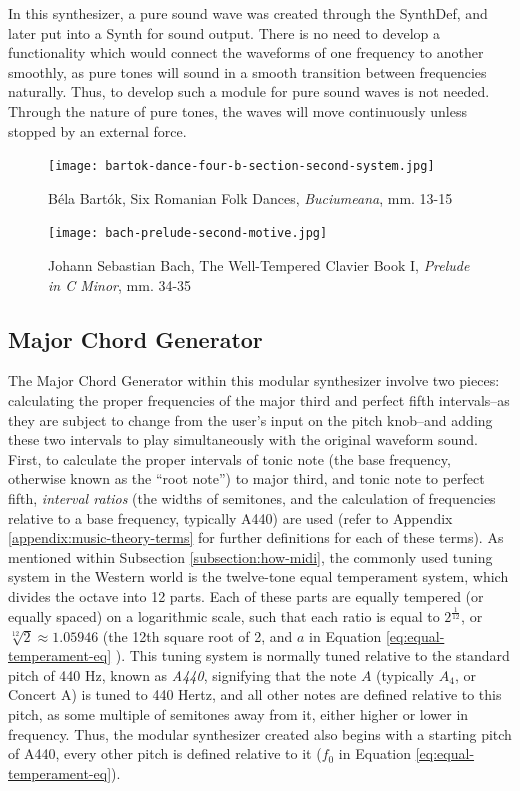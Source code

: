In this synthesizer, a pure sound wave was created through the SynthDef, and later put into a Synth for sound output. There is no need to develop a functionality which would connect the waveforms of one frequency to another smoothly, as pure tones will sound in a smooth transition between frequencies naturally. Thus, to develop such a module for pure sound waves is not needed. Through the nature of pure tones, the waves will move continuously unless stopped by an external force. 

\begin{figure}[h]
  \centering
  \texttt{[image: bartok-dance-four-b-section-second-system.jpg]}
  \caption{Béla Bartók, Six Romanian Folk Dances, \textit{Buciumeana},  mm. 13-15}
  \label{fig:legato-notes-example}
\end{figure}

\begin{figure}[h]
  \centering
  \texttt{[image: bach-prelude-second-motive.jpg]}
  \caption{Johann Sebastian Bach, The Well-Tempered Clavier Book I, \textit{Prelude in C Minor}, mm. 34-35}
  \label{fig:tied-notes-example}
\end{figure}

\subsection{Major Chord Generator}

The Major Chord Generator within this modular synthesizer involve two pieces: calculating the proper frequencies of the major third and perfect fifth intervals--as they are subject to change from the user's input on the pitch knob--and adding these two intervals to play simultaneously with the original waveform sound. First, to calculate the proper intervals of tonic note (the base frequency, otherwise known as the ``root note'') to major third, and tonic note to perfect fifth, \textit{interval ratios} (the widths of semitones, and the calculation of frequencies relative to a base frequency, typically A440) are used (refer to Appendix \ref{appendix:music-theory-terms} for further definitions for each of these terms). As mentioned within Subsection \ref{subsection:how-midi}, the commonly used tuning system in the Western world is the twelve-tone equal temperament system, which divides the octave into 12 parts. Each of these parts are equally tempered (or equally spaced) on a logarithmic scale, such that each ratio is equal to $2^\frac{1}{12}$, or $\sqrt[12]{2} \approx 1.05946$ (the 12th square root of 2, and $a$ in Equation \ref{eq:equal-temperament-eq} \cite{Suits_1998}). This tuning system is normally tuned relative to the standard pitch of 440 Hz, known as \textit{A440}, signifying that the note $A$ (typically $A_4$, or Concert A) is tuned to 440 Hertz, and all other notes are defined relative to this pitch, as some multiple of semitones away from it, either higher or lower in frequency. Thus,  the modular synthesizer created also begins with a starting pitch of A440, every other pitch is defined relative to it ($f_0$ in Equation \ref{eq:equal-temperament-eq}).

